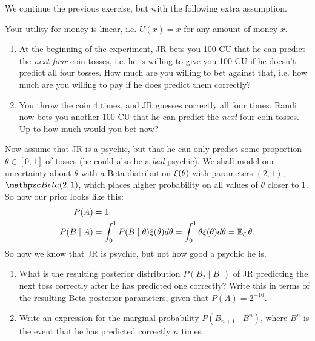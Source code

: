 \documentclass[twoside,a4paper]{article}
\begin{document}
\begin{exercise}
  We continue the previous exercise, but with the following extra assumption.
  \begin{assumption}
    Your utility for money is linear, i.e. $U(x) = x$ for
    any amount of money $x$.
  \end{assumption}     
  \begin{enumerate}  
  \item At the beginning of the experiment, JR bets you 100 CU that he can predict the \emph{next four} coin tosses, i.e. he is willing to give you 100 CU if he doesn't predict all four tosses. How much are you willing to bet against that, i.e. how much are you willing to pay if he does predict them correctly?
  \item You throw the coin 4 times, and JR guesses correctly all four
    times. Randi now bets you another 100 CU that he can predict the
    \emph{next} four coin tosses. Up to how much would you bet now?
  \end{enumerate}
\end{exercise}

\begin{exercise}
  Now assume that JR is a psychic, but that he can only predict some proportion $\theta \in [0,1]$ of tosses (he could also be a \emph{bad} psychic).
We shall model our uncertainty about $\theta$ with a Beta distribution $\xi(\theta)$ with parameters $(2, 1)$, $\Beta(2,1)$, which places higher probability on all values of $\theta$ closer to $1$. So now our prior looks like this:
\begin{align}
  P(A) &= 1\\
  P(B \mid A) &= \int_0^1 P(B \mid \theta) \xi(\theta) d\theta = \int_0^1 \theta \xi(\theta) d\theta = \mathop{\mbox{\ensuremath{\mathbb{E}}}}\nolimits_\xi \theta.\\
\end{align}
So now we know that JR is psychic, but not how good a psychic he is.
\begin{enumerate}
\item What is the resulting posterior distribution $P(B_2 \mid B_1)$ of JR predicting the next toss correctly after he has predicted one correctly? Write this in terms of the resulting Beta posterior parameters, given that $P(A) = 2^{-16}$.
\item Write an expression for the marginal probability $P(B_{n+1} \mid B^n)$, where $B^n$ is the event that he has predicted correctly $n$ times.
\end{enumerate}

\end{exercise}
\end{document}

